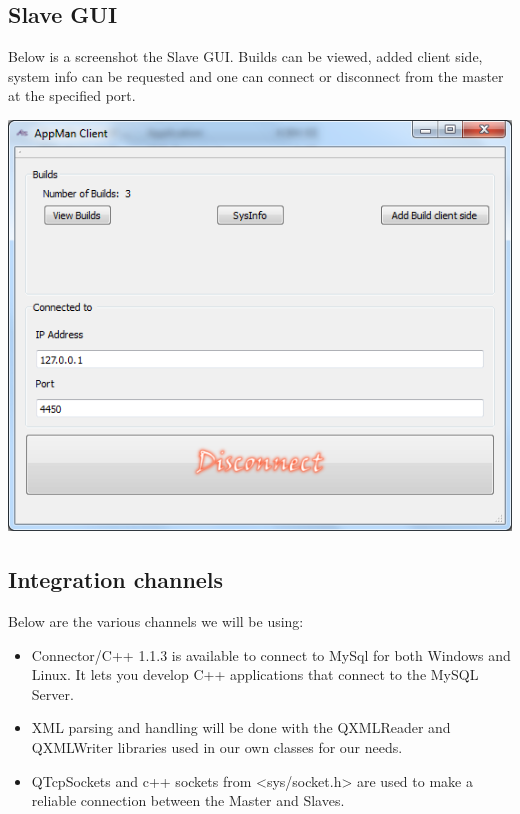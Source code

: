 \documentclass[a4paper,12pt,final]{article}
\begin{document}
 \subsection{Slave GUI}
Below is a screenshot the Slave GUI. Builds can be viewed, added client side, system info can be requested and one can connect or disconnect from the master at the specified port.
\begin{center}
  	\includegraphics[scale=0.6]{AppManClientGui.png}
  \end{center} 
\subsection{Integration channels}
Below are the various channels we will be using:
\begin{itemize}
\item Connector/C++ 1.1.3 is available to connect to MySql for both Windows and Linux. It lets you develop C++ applications that connect to the MySQL Server.
\item XML parsing and handling will be done with the QXMLReader and QXMLWriter libraries used in our own classes for our needs.
\item QTcpSockets and c++ sockets from <sys/socket.h> are used to make a reliable connection between the Master and Slaves.
\end{itemize}

\newpage
\end{document}
